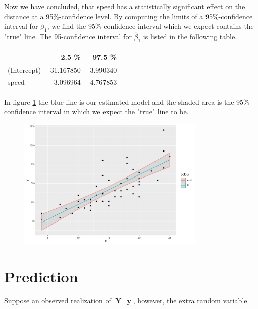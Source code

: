 \begin{example} 
Now we have concluded, that speed has a statistically significant effect on the distance at a 95\%-confidence level. 
By computing the limits of a 95\%-confidence interval for $\hat{\beta}_1$, we find the 95\%-confidence interval which we expect contains the "true" line.
The 95-confidence interval for $\hat{\beta}_1$ is listed in the following table.

\begin{table}[H]
\centering
\begin{tabular}{lrr}
\toprule
 & \textbf{2.5 \%} & \textbf{97.5 \%}\\
\midrule
(Intercept) & -31.167850 & -3.990340\\
speed & 3.096964 & 4.767853\\
\bottomrule
\end{tabular}
\end{table}

In figure \ref{fig:t_distributionplot2} the blue line is our estimated model and the shaded area is the 95\%-confidence interval in which we expect the "true" line to be. 

\begin{figure}[H]
    \centering
    \includegraphics[width = 0.8\textwidth]{figures/Nanna/Konfidensinterval.pdf}
    \caption{}
    \label{fig:t_distributionplot2}
\end{figure}



\end{example}

\section{Prediction}

Suppose an observed realization of $\textbf{Y}=\textbf{y}$, however, the extra random variable 

